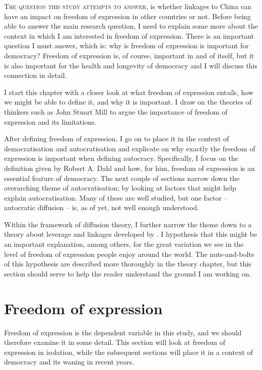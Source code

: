 \lettrine{T}{he question this study attempts to answer}, is whether linkages to China can have an impact on freedom of expression in other countries or not. Before being able to answer the main research question, I need to explain some more about the context in which I am interested in freedom of expression. There is an important question I must answer, which is: why is freedom of expression is important for democracy? Freedom of expression is, of course, important in and of itself, but it is also important for the health and longevity of democracy and I will discuss this connection in detail.  

I start this chapter with a closer look at what freedom of expression entails, how we might be able to define it, and why it is important.  I draw on the theories of thinkers such as John Stuart Mill to argue the importance of freedom of expression and its limitations.

After defining freedom of expression, I go on to place it in the context of democratisation and autocratisation and explicate on why exactly the freedom of expression is important when defining autocracy. Specifically, I focus on the definition given by Robert A. Dahl and how, for him, freedom of expression is an essential feature of democracy. The next couple of sections narrow down the overarching theme of autocratisation; by looking at factors that might help explain autocratisation. Many of these are well studied, but one factor -- autocratic diffusion -- is, as of yet, not well enough understood. 

Within the framework of diffusion theory, I further narrow the theme down to a theory about leverage and linkages developed by \citet{levitsky_linkage_2006}. I hypothesis that this might be an important explanation, among others, for the great variation we see in the level of freedom of expression people enjoy around the world. The nuts-and-bolts of this hypothesis are described more thoroughly in the theory chapter, but this section should serve to help the reader understand the ground I am working on. 

\section{Freedom of expression}
Freedom of expression is the dependent variable in this study, and we should therefore examine it in some detail. This section will look at freedom of expression in isolation, while the subsequent sections will place it in a context of democracy and its waning in recent years. 

